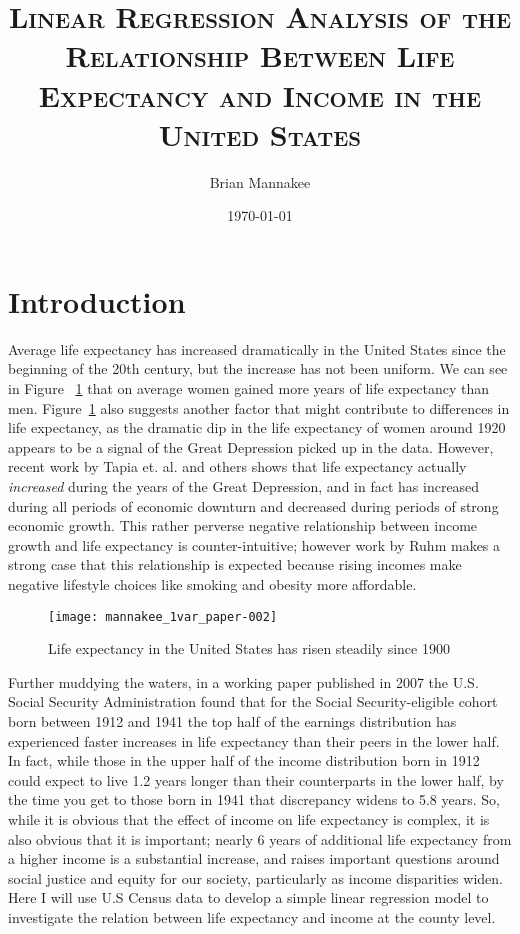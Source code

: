 \documentclass[12pt]{article}
\title{\textsc{Linear Regression Analysis of the Relationship Between Life Expectancy and Income in the United States}}
\author{Brian Mannakee}
\date{\today} %
\begin{document}

\maketitle

\newpage
\section*{Introduction}
Average life expectancy has increased dramatically in the United States since the beginning of the 20th century, but the increase has not been uniform. We can see in Figure ~\ref{fig1} that on average women gained more years of life expectancy than men. Figure~\ref{fig1} also suggests another factor that might contribute to differences in life expectancy, as the dramatic dip in the life expectancy of women around 1920 appears to be a signal of the Great Depression picked up in the data. However, recent work by Tapia et. al.\cite{Tapia} and others shows that life expectancy actually \emph{increased} during the years of the Great Depression, and in fact has increased during all periods of economic downturn and decreased during periods of strong economic growth. This rather perverse negative relationship between income growth and life expectancy is counter-intuitive; however work by Ruhm makes a strong case that this relationship is expected because rising incomes make negative lifestyle choices like smoking and obesity more affordable\cite{Ruhm}. 
\begin{figure}[h]
\begin{center}
\texttt{[image: mannakee\_1var\_paper-002]}
\end{center}
\caption{Life expectancy in the United States has risen steadily since 1900}
\label{fig1}
\end{figure}
Further muddying the waters, in a working paper published in 2007\cite{ssareport} the U.S. Social Security Administration found that for the Social Security-eligible cohort born between 1912 and 1941 the top half of the earnings distribution has experienced faster increases in life expectancy than their peers in the lower half. In fact, while those in the upper half of the income distribution born in 1912 could expect to live 1.2 years longer than their counterparts in the lower half, by the time you get to those born in 1941 that discrepancy widens to 5.8 years. So, while it is obvious that the effect of income on life expectancy is complex, it is also obvious that it is important; nearly 6 years of additional life expectancy from a higher income is a substantial increase, and raises important questions around social justice and equity for our society, particularly as income disparities widen. Here I will use U.S Census data to develop a simple linear regression model to investigate the relation between life expectancy and income at the county level.
\end{document}
